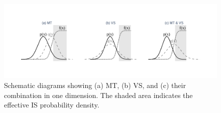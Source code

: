     \begin{figure}[H]
        \centering
        \includegraphics[scale=0.40]{Figures/Images/Importance Sampling Technique/IS_techniques.png}
        \caption{Schematic diagrams showing (a) MT, (b) VS, and (c) their combination in one dimension. The shaded area indicates the effective IS probability density. \protect\cite{lu_improved_1988}}
        \label{fig:IS_techniques}
    \end{figure}